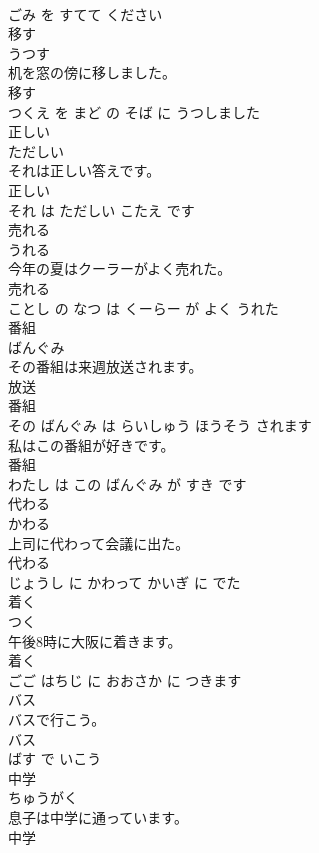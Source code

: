 \documentclass[8pt]{extreport}
\begin{document}
\begin{CJK}{UTF8}{min}
\\	ごみ を すてて ください			
\\	移す	
\\	うつす			
\\	机を窓の傍に移しました。	
\\	移す 
\\	つくえ を まど の そば に うつしました			
\\	正しい	
\\	ただしい			
\\	それは正しい答えです。	
\\	正しい 
\\	それ は ただしい こたえ です			
\\	売れる	
\\	うれる			
\\	今年の夏はクーラーがよく売れた。	
\\	売れる 
\\	ことし の なつ は くーらー が よく うれた			
\\	番組	
\\	ばんぐみ			
\\	その番組は来週放送されます。	
\\	放送 
\\	番組 
\\	その ばんぐみ は らいしゅう ほうそう されます			
\\	私はこの番組が好きです。	
\\	番組 
\\	わたし は この ばんぐみ が すき です			
\\	代わる	
\\	かわる			
\\	上司に代わって会議に出た。	
\\	代わる 
\\	じょうし に かわって かいぎ に でた			
\\	着く	
\\	つく			
\\	午後8時に大阪に着きます。	
\\	着く 
\\	ごご はちじ に おおさか に つきます			
\\	バス	
\\	バスで行こう。	
\\	バス 
\\	ばす で いこう			
\\	中学	
\\	ちゅうがく			
\\	息子は中学に通っています。	
\\	中学 

\end{CJK}
\end{document}
